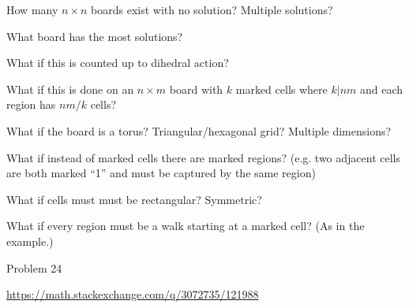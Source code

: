 \documentclass{article}
\begin{document}
\begin{related}
  \item How many $n \times n$ boards exist with no solution? Multiple solutions?
  \item What board has the most solutions?
  \item What if this is counted up to dihedral action?
  \item What if this is done on an $n \times m$ board with $k$ marked cells where
    $k | nm$ and each region has $nm/k$ cells?
  \item What if the board is a torus? Triangular/hexagonal grid? Multiple dimensions?
  \item What if instead of marked cells there are marked regions? (e.g. two
    adjacent cells are both marked ``1'' and must be captured by the same region)
  \item What if cells must must be rectangular? Symmetric?
  \item What if every region must be a walk starting at a marked cell?
    (As in the example.)
\end{related}

\begin{references}
  \item Problem 24
  \item \url{https://math.stackexchange.com/q/3072735/121988}
\end{references}
\end{document}
